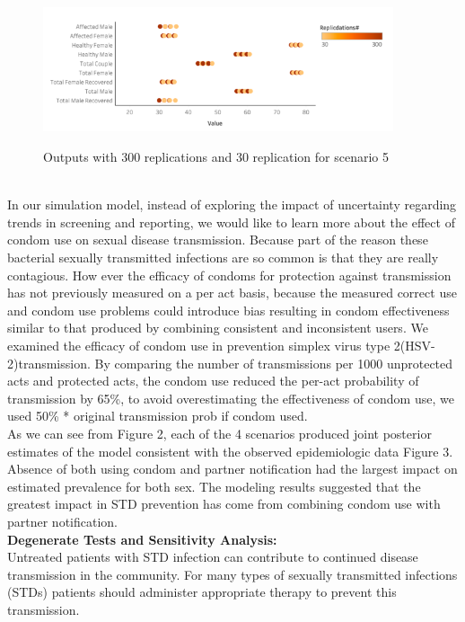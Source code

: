 \documentclass{article}
\begin{document}
\begin{normalsize}
 \begin{figure}[H]
    \caption{Outputs with 300 replications and 30 replication for scenario 5}
\includegraphics[width=0.92\textwidth]{plt6.png}
\label{fig:plt6}
\end{figure}\\
 In our simulation model, instead of exploring the impact of uncertainty regarding trends in screening and reporting, we would like to learn more about the effect of condom use on sexual disease transmission. Because part of the reason these bacterial sexually transmitted infections are so common is that they are really contagious\cite{warner2006}.
 How ever the efficacy of condoms for protection against transmission has not previously measured on a per act basis, because the measured correct use and condom use problems could introduce bias resulting in condom effectiveness similar to that produced by combining consistent and inconsistent users.
 We examined the efficacy of condom use in prevention simplex virus type 2(HSV-2)transmission\cite{magaret2015}. By comparing the number of transmissions per 1000 unprotected acts and protected acts, the condom use reduced the per-act probability of transmission by 65\%, to avoid overestimating the effectiveness of condom use, we used 50\% * original transmission prob if condom used. \\
 

 
 As we can see from Figure 2, each of the 4 scenarios produced joint posterior estimates of the model consistent with the observed epidemiologic data Figure 3. Absence of both using condom and partner notification had the largest impact on estimated prevalence for both sex. The modeling results suggested that the greatest impact in STD prevention has come from combining condom use with partner notification.\\
 
\textbf{Degenerate Tests and Sensitivity Analysis:}\\

Untreated patients with STD infection can contribute to continued disease transmission in the community. For many types of sexually transmitted infections (STDs) patients should administer appropriate therapy to prevent this transmission. \\


\end{normalsize}
\end{document}
